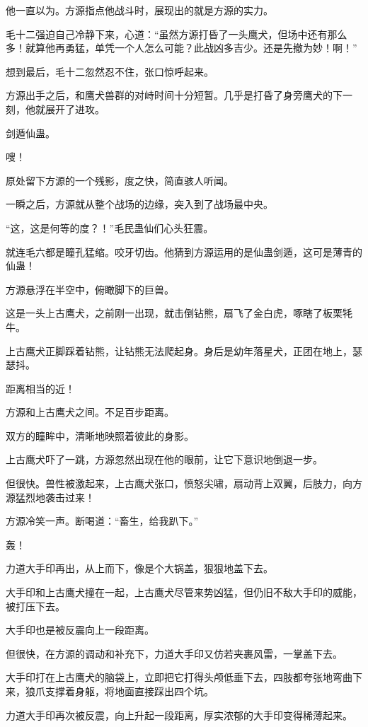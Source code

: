 \begin{this_body}
他一直以为。方源指点他战斗时，展现出的就是方源的实力。

毛十二强迫自己冷静下来，心道：“虽然方源打昏了一头鹰犬，但场中还有那么多！就算他再勇猛，单凭一个人怎么可能？此战凶多吉少。还是先撤为妙！啊！”

想到最后，毛十二忽然忍不住，张口惊呼起来。

方源出手之后，和鹰犬兽群的对峙时间十分短暂。几乎是打昏了身旁鹰犬的下一刻，他就展开了进攻。

剑遁仙蛊。

嗖！

原处留下方源的一个残影，度之快，简直骇人听闻。

一瞬之后，方源就从整个战场的边缘，突入到了战场最中央。

“这，这是何等的度？！”毛民蛊仙们心头狂震。

就连毛六都是瞳孔猛缩。咬牙切齿。他猜到方源运用的是仙蛊剑遁，这可是薄青的仙蛊！

方源悬浮在半空中，俯瞰脚下的巨兽。

这是一头上古鹰犬，之前刚一出现，就击倒钻熊，扇飞了金白虎，啄瞎了板栗牦牛。

上古鹰犬正脚踩着钻熊，让钻熊无法爬起身。身后是幼年落星犬，正团在地上，瑟瑟抖。

距离相当的近！

方源和上古鹰犬之间。不足百步距离。

双方的瞳眸中，清晰地映照着彼此的身影。

上古鹰犬吓了一跳，方源忽然出现在他的眼前，让它下意识地倒退一步。

但很快。兽性被激起来，上古鹰犬张口，愤怒尖啸，扇动背上双翼，后肢力，向方源猛烈地袭击过来！

方源冷笑一声。断喝道：“畜生，给我趴下。”

轰！

力道大手印再出，从上而下，像是个大锅盖，狠狠地盖下去。

大手印和上古鹰犬撞在一起，上古鹰犬尽管来势凶猛，但仍旧不敌大手印的威能，被打压下去。

大手印也是被反震向上一段距离。

但很快，在方源的调动和补充下，力道大手印又仿若夹裹风雷，一掌盖下去。

大手印打在上古鹰犬的脑袋上，立即把它打得头颅低垂下去，四肢都夸张地弯曲下来，狼爪支撑着身躯，将地面直接踩出四个坑。

力道大手印再次被反震，向上升起一段距离，厚实浓郁的大手印变得稀薄起来。


\end{this_body}
